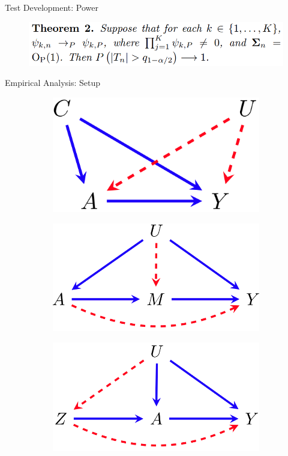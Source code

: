 \documentclass{beamer}
\begin{document}
\begin{frame}{Test Development: Power}
	\begin{figure}
		\center
		\includegraphics[scale=0.3]{theorem2.png}
	\end{figure}
\end{frame}

\begin{frame}{Empirical Analysis: Setup}
	\begin{figure}
		\begin{subfigure}{0.33 \textwidth}
			\center
			\includegraphics[scale=0.15]{m1.png}
		\end{subfigure}%
		\begin{subfigure}{0.33 \textwidth}
			\center
			\includegraphics[scale=0.15]{m2.png}
		\end{subfigure}%
		\begin{subfigure}{0.33 \textwidth}
			\center
			\includegraphics[scale=0.15]{m3.png}

\end{subfigure}
\end{figure}
\end{frame}
\end{document}
